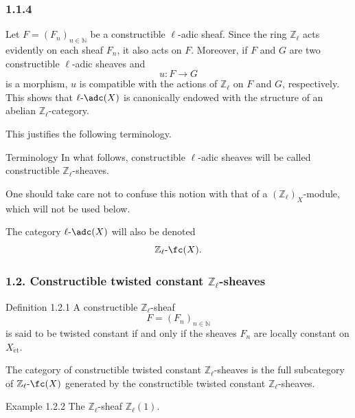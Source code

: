 \subsubsection*{1.1.4}
Let \(F=(F_n)_{n\in\mathbb N}\) be a constructible \(\ell\)-adic sheaf. Since the ring \(\mathbb Z_\ell\) acts evidently on each sheaf \(F_n\), it also acts on \(F\). Moreover, if \(F\) and \(G\) are two constructible \(\ell\)-adic sheaves and
\[
u:F\longrightarrow G
\]
is a morphism, \(u\) is compatible with the actions of \(\mathbb Z_\ell\) on \(F\) and \(G\), respectively. This shows that \(\ell\text{-}\adc(X)\) is canonically endowed with the structure of an abelian \(\mathbb Z_\ell\)-category.

This justifies the following terminology.

\begin{statement}{Terminology}
In what follows, constructible \(\ell\)-adic sheaves will be called constructible \(\mathbb Z_\ell\)-sheaves.
\end{statement}

One should take care not to confuse this notion with that of a \((\mathbb Z_\ell)_X\)-module, which will not be used below.

The category \(\ell\text{-}\adc(X)\) will also be denoted
\[
\mathbb Z_\ell\text{-}\fc(X).
\]

\subsubsection*{1.2. Constructible twisted constant \(\mathbb Z_\ell\)-sheaves}

\begin{statement}{Definition 1.2.1}
A constructible \(\mathbb Z_\ell\)-sheaf
\[
F=(F_n)_{n\in\mathbb N}
\]
is said to be twisted constant if and only if the sheaves \(F_n\) are locally constant on \(X_{\mathrm{\acute et}}\).
\end{statement}

The category of constructible twisted constant \(\mathbb Z_\ell\)-sheaves is the full subcategory of \(\mathbb Z_\ell\text{-}\fc(X)\) generated by the constructible twisted constant \(\mathbb Z_\ell\)-sheaves.

\begin{statement}{Example 1.2.2}
The \(\mathbb Z_\ell\)-sheaf \(\mathbb Z_\ell(1)\).
\end{statement}

